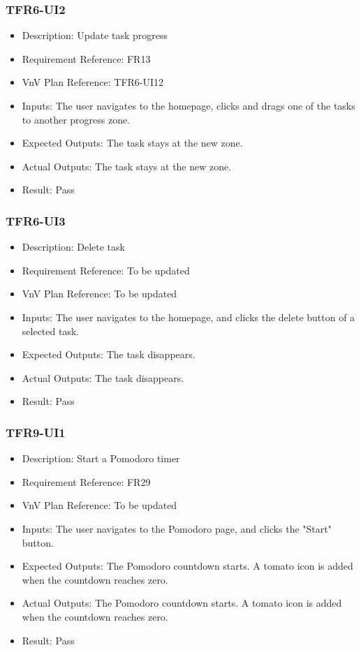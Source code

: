 \documentclass[12pt, titlepage]{article}
\begin{document}
\subsubsection{TFR6-UI2}\label{3.2.8}
\begin{itemize}
    \item Description: Update task progress
    \item Requirement Reference: FR13
    \item VnV Plan Reference: TFR6-UI12
    \item Inputs: The user navigates to the homepage, clicks and drags one of the tasks to another progress zone.
    \item Expected Outputs: The task stays at the new zone.
    \item Actual Outputs: The task stays at the new zone.
    \item Result: Pass
\end{itemize}

\subsubsection{TFR6-UI3}\label{3.2.9}
\begin{itemize}
    \item Description: Delete task
    \item Requirement Reference: To be updated
    \item VnV Plan Reference: To be updated
    \item Inputs: The user navigates to the homepage, and clicks the delete button of a selected task.
    \item Expected Outputs: The task disappears.
    \item Actual Outputs: The task disappears.
    \item Result: Pass
\end{itemize}

\subsubsection{TFR9-UI1}\label{3.2.10}
\begin{itemize}
    \item Description: Start a Pomodoro timer
    \item Requirement Reference: FR29
    \item VnV Plan Reference: To be updated
    \item Inputs: The user navigates to the Pomodoro page, and clicks the "Start" button.
    \item Expected Outputs: The Pomodoro countdown starts.  A tomato icon is added when the countdown reaches zero.
    \item Actual Outputs: The Pomodoro countdown starts.  A tomato icon is added when the countdown reaches zero.
    \item Result: Pass
\end{itemize}
\end{document}
